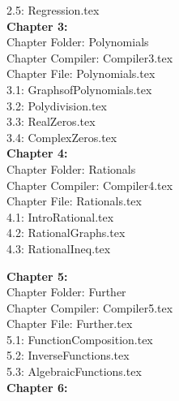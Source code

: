 \documentclass[11pt]{book}
\theoremstyle{definition}  %
\begin{document}
\begin{multicols}{2}
2.5:  Regression.tex \\

\textbf{Chapter 3:} \\


Chapter Folder:  Polynomials \\

Chapter Compiler:  Compiler3.tex \\

Chapter File:  Polynomials.tex \\

3.1:  GraphsofPolynomials.tex \\

3.2:  Polydivision.tex \\

3.3:  RealZeros.tex \\

3.4:  ComplexZeros.tex \\


\textbf{Chapter 4:} \\


Chapter Folder:  Rationals \\

Chapter Compiler:  Compiler4.tex \\

Chapter File:  Rationals.tex \\

4.1:  IntroRational.tex \\

4.2:  RationalGraphs.tex \\

4.3:  RationalIneq.tex \\

\newpage

\textbf{Chapter 5:} \\


Chapter Folder: Further \\

Chapter Compiler:  Compiler5.tex \\

Chapter File:  Further.tex \\

5.1:  FunctionComposition.tex \\

5.2:  InverseFunctions.tex \\

5.3:  AlgebraicFunctions.tex \\

\textbf{Chapter 6:} \\



\end{multicols}
\end{document}
